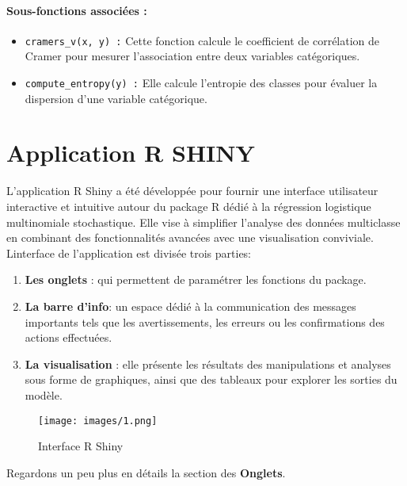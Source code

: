 \documentclass{rapport}
\begin{document}
\paragraph{Sous-fonctions associées :}
\begin{itemize}
    \item \texttt{cramers\_v(x, y) :} Cette fonction calcule le coefficient de corrélation de Cramer pour mesurer l’association entre deux variables catégoriques.
    \item \texttt{compute\_entropy(y) :} Elle calcule l’entropie des classes pour évaluer la dispersion d’une variable catégorique.
\end{itemize}




\section{Application R SHINY}

L'application R Shiny a été développée pour fournir une interface utilisateur interactive et intuitive autour du package R dédié à la régression logistique multinomiale stochastique. Elle vise à simplifier l'analyse des données multiclasse en combinant des fonctionnalités avancées avec une visualisation conviviale. Linterface de l'application est divisée trois parties:
\begin{enumerate}
    \item \textbf{Les onglets} : qui permettent de paramétrer les fonctions du package.
    \item \textbf{La barre d'info}: un espace dédié à la communication des messages importants tels que les avertissements, les erreurs ou les confirmations des actions effectuées.
    \item \textbf{La visualisation} : elle présente les résultats des manipulations et analyses sous forme de graphiques, ainsi que des tableaux pour explorer les sorties du modèle.
\end{enumerate}
 

\begin{figure}[H]
    \centering
    \texttt{[image: images/1.png]}
    \caption{Interface R Shiny}
    \label{fig:app_r_shiny}
\end{figure}

Regardons un peu plus en détails la section des \textbf{Onglets}.
\end{document}
